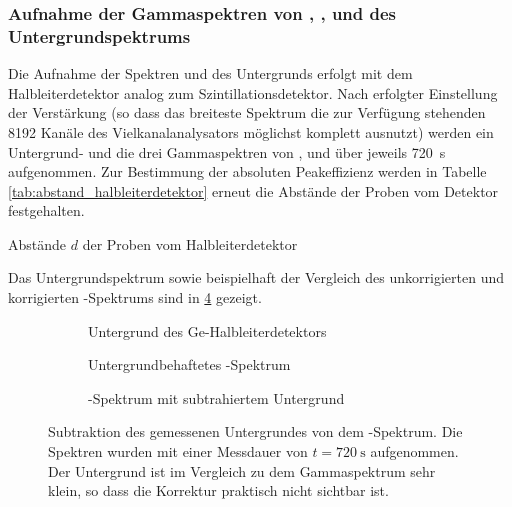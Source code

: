 \documentclass[11pt, a4paper]{article}
\numberwithin{equation}{section}
\newcommand{\co}{\isotope[60]{Co}}
\newcommand{\cs}{\isotope[137]{Cs}}
\begin{document}
\subsubsection{Aufnahme der Gammaspektren von , ,  und des Untergrundspektrums}
Die Aufnahme der Spektren und des Untergrunds erfolgt mit dem Halbleiterdetektor analog zum Szintillationsdetektor.
Nach erfolgter Einstellung der Verstärkung (so dass das breiteste Spektrum die zur Verfügung stehenden 8192 Kanäle des Vielkanalanalysators möglichst komplett ausnutzt) werden ein Untergrund- und die drei Gammaspektren von \co{}, \cs{} und  über jeweils \SI{720}{\second} aufgenommen.
Zur Bestimmung der absoluten Peakeffizienz werden in Tabelle \ref{tab:abstand_halbleiterdetektor} erneut die Abstände der Proben vom Detektor festgehalten.
\begin{table}[h]
	\centering
	
	\caption{Abstände $d$ der Proben vom Halbleiterdetektor}
	\label{tab:abstand_halbleiterdetektor}
\end{table}
Das Untergrundspektrum sowie beispielhaft der Vergleich des unkorrigierten und korrigierten \cs-Spektrums sind in \ref{fig:abzug_untergrund_halb} gezeigt.
\begin{figure}[hp]
	\centering
	\begin{subfigure}[b]{0.65\textwidth}
		\resizebox{!}{0.285\textheight}{
			
		}
		\caption{Untergrund des Ge-Halbleiterdetektors}
		\label{fig:untergrund_halb}
	\end{subfigure}
	
	\begin{subfigure}[b]{0.65\textwidth}
		\resizebox{!}{0.285\textheight}{
			
		}
		\caption{Untergrundbehaftetes -Spektrum}
		\label{fig:caesium_mit_untergrund}
	\end{subfigure}
	
	\begin{subfigure}[b]{0.65\textwidth}
		\resizebox{!}{0.285\textheight}{
			
		}
		\caption{-Spektrum mit subtrahiertem Untergrund}
		\label{fig:caesium_ohne_untergrund}
	\end{subfigure}
	\caption{Subtraktion des gemessenen Untergrundes von dem -Spektrum. Die Spektren wurden mit einer Messdauer von $t = \SI{720}{\second}$ aufgenommen. Der Untergrund ist im Vergleich zu dem Gammaspektrum sehr klein, so dass die Korrektur praktisch nicht sichtbar ist.}
	\label{fig:abzug_untergrund_halb}
\end{figure}
\end{document}
